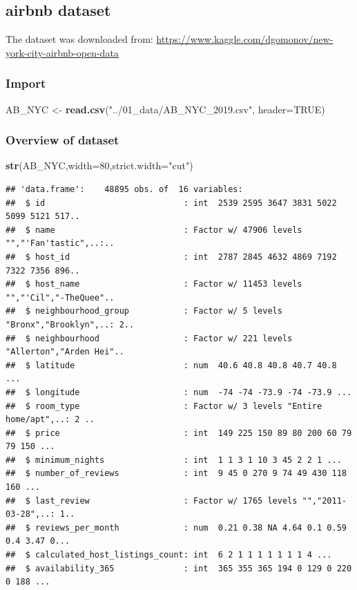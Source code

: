 \documentclass[]{article}
\newenvironment{Shaded}{\begin{snugshade}}{\end{snugshade}}
\newcommand{\DataTypeTok}[1]{\textcolor[rgb]{0.13,0.29,0.53}{#1}}
\newcommand{\DecValTok}[1]{\textcolor[rgb]{0.00,0.00,0.81}{#1}}
\newcommand{\KeywordTok}[1]{\textcolor[rgb]{0.13,0.29,0.53}{\textbf{#1}}}
\newcommand{\NormalTok}[1]{#1}
\newcommand{\OtherTok}[1]{\textcolor[rgb]{0.56,0.35,0.01}{#1}}
\newcommand{\StringTok}[1]{\textcolor[rgb]{0.31,0.60,0.02}{#1}}
\begin{document}
\hypertarget{airbnb-dataset}{%
\subsection{airbnb dataset}\label{airbnb-dataset}}

The dataset was downloaded from:
\url{https://www.kaggle.com/dgomonov/new-york-city-airbnb-open-data}

\hypertarget{import}{%
\subsubsection{Import}\label{import}}

\begin{Shaded}
\begin{Highlighting}[]
\NormalTok{AB_NYC <-}\StringTok{ }\KeywordTok{read.csv}\NormalTok{(}\StringTok{"../01_data/AB_NYC_2019.csv"}\NormalTok{, }\DataTypeTok{header=}\OtherTok{TRUE}\NormalTok{)}
\end{Highlighting}
\end{Shaded}

\hypertarget{overview-of-dataset}{%
\subsubsection{Overview of dataset}\label{overview-of-dataset}}

\begin{Shaded}
\begin{Highlighting}[]
\KeywordTok{str}\NormalTok{(AB_NYC,}\DataTypeTok{width=}\DecValTok{80}\NormalTok{,}\DataTypeTok{strict.width=}\StringTok{"cut"}\NormalTok{)}
\end{Highlighting}
\end{Shaded}

\begin{verbatim}
## 'data.frame':    48895 obs. of  16 variables:
##  $ id                            : int  2539 2595 3647 3831 5022 5099 5121 517..
##  $ name                          : Factor w/ 47906 levels "","'Fan'tastic",..:..
##  $ host_id                       : int  2787 2845 4632 4869 7192 7322 7356 896..
##  $ host_name                     : Factor w/ 11453 levels "","'Cil","-TheQuee"..
##  $ neighbourhood_group           : Factor w/ 5 levels "Bronx","Brooklyn",..: 2..
##  $ neighbourhood                 : Factor w/ 221 levels "Allerton","Arden Hei"..
##  $ latitude                      : num  40.6 40.8 40.8 40.7 40.8 ...
##  $ longitude                     : num  -74 -74 -73.9 -74 -73.9 ...
##  $ room_type                     : Factor w/ 3 levels "Entire home/apt",..: 2 ..
##  $ price                         : int  149 225 150 89 80 200 60 79 79 150 ...
##  $ minimum_nights                : int  1 1 3 1 10 3 45 2 2 1 ...
##  $ number_of_reviews             : int  9 45 0 270 9 74 49 430 118 160 ...
##  $ last_review                   : Factor w/ 1765 levels "","2011-03-28",..: 1..
##  $ reviews_per_month             : num  0.21 0.38 NA 4.64 0.1 0.59 0.4 3.47 0...
##  $ calculated_host_listings_count: int  6 2 1 1 1 1 1 1 1 4 ...
##  $ availability_365              : int  365 355 365 194 0 129 0 220 0 188 ...
\end{verbatim}
\end{document}

